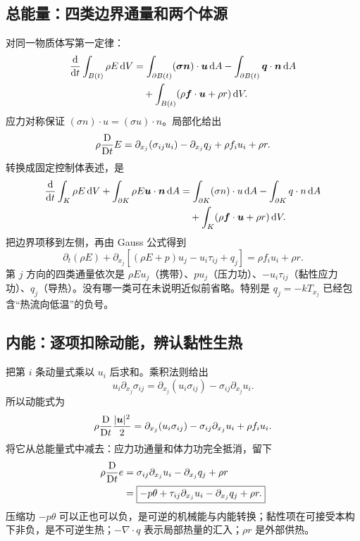\subsection{总能量：四类边界通量和两个体源}

对同一物质体写第一定律：
\begin{align}
 \frac{\mathrm d}{\mathrm dt}\int_{B(t)}\rho E\,\mathrm d V
 &=\int_{\partial B(t)}(\bm{\sigma}\bm{n})\cdot\bm{u}\,\mathrm d A
 -\int_{\partial B(t)}\bm{q}\cdot\bm{n}\,\mathrm d A\notag\\
 &\quad+\int_{B(t)}(\rho\bm{f}\cdot\bm{u}+\rho r)\,\mathrm d V.
\end{align}
应力对称保证 $(\sigma n)\cdot u=(\sigma u)\cdot n$。局部化给出
\begin{equation}
 \rho\frac{\mathrm D}{\mathrm Dt} E=\partial_{x_j}(\sigma_{ij}u_i)-\partial_{x_j}q_j
 +\rho f_i u_i+\rho r.
\end{equation}
转换成固定控制体表述，是
\begin{align}
 \frac{\mathrm d}{\mathrm dt}\int_K\rho E\,\mathrm d V
 +\int_{\partial K}\rho E\bm{u}\cdot\bm{n}\,\mathrm d A
 &=\int_{\partial K}(\sigma n)\cdot u\,\mathrm d A-\int_{\partial K}q\cdot n\,\mathrm d A\notag\\
 &\quad+\int_K(\rho\bm{f}\cdot\bm{u}+\rho r)\,\mathrm d V.
 \label{eq:cns-energy-integral}
\end{align}
把边界项移到左侧，再由 Gauss 公式得到
\begin{equation}
 \boxed{\partial_t(\rho E)+\partial_{x_j}
 \left[(\rho E+p)u_j-u_i\tau_{ij}+q_j\right]
 =\rho f_i u_i+\rho r.}\label{eq:cns-energy-cons}
\end{equation}
第 $j$ 方向的四类通量依次是 $\rho E u_j$（携带）、$pu_j$（压力功）、$-u_i\tau_{ij}$（黏性应力功）、$q_j$（导热）。没有哪一类可在未说明近似前省略。特别是 $q_j=-kT_{x_j}$ 已经包含“热流向低温”的负号。

\subsection{内能：逐项扣除动能，辨认黏性生热}

把第 $i$ 条动量式乘以 $u_i$ 后求和。乘积法则给出
\begin{equation}
 u_i\partial_{x_j}\sigma_{ij}
 =\partial_{x_j}(u_i\sigma_{ij})-\sigma_{ij}\partial_{x_j}u_i.
\end{equation}
所以动能式为
\begin{equation}
 \rho\frac{\mathrm D}{\mathrm Dt}\frac{|\bm{u}|^2}{2}
 =\partial_{x_j}(u_i\sigma_{ij})-\sigma_{ij}\partial_{x_j}u_i
 +\rho f_i u_i.\label{eq:cns-kinetic}
\end{equation}
将它从总能量式中减去：应力功通量和体力功完全抵消，留下
\begin{align}
 \rho\frac{\mathrm D}{\mathrm Dt} e&=\sigma_{ij}\partial_{x_j}u_i-\partial_{x_j}q_j+\rho r\\
 &=\boxed{-p\theta+\tau_{ij}\partial_{x_j}u_i-\partial_{x_j}q_j+\rho r.}
 \label{eq:cns-internal-detail}
\end{align}
压缩功 $-p\theta$ 可以正也可以负，是可逆的机械能与内能转换；黏性项在可接受本构下非负，是不可逆生热；$-\nabla\cdot q$ 表示局部热量的汇入；$\rho r$ 是外部供热。

